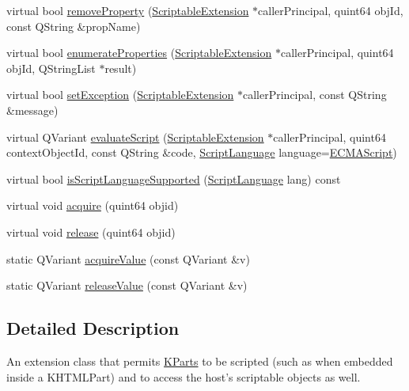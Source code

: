 \begin{DoxyCompactItemize}
\item 
virtual bool \hyperlink{classKParts_1_1ScriptableExtension_a72c9018ac01d931c4218ddbf963f93fb}{remove\-Property} (\hyperlink{classKParts_1_1ScriptableExtension}{\-Scriptable\-Extension} $\ast$caller\-Principal, quint64 obj\-Id, const \-Q\-String \&prop\-Name)
\item 
virtual bool \hyperlink{classKParts_1_1ScriptableExtension_a7630a47519df9f1ad5741e8d7cc436c2}{enumerate\-Properties} (\hyperlink{classKParts_1_1ScriptableExtension}{\-Scriptable\-Extension} $\ast$caller\-Principal, quint64 obj\-Id, \-Q\-String\-List $\ast$result)
\item 
virtual bool \hyperlink{classKParts_1_1ScriptableExtension_ac27156b3a945cb5ac69bbdfb18a501e8}{set\-Exception} (\hyperlink{classKParts_1_1ScriptableExtension}{\-Scriptable\-Extension} $\ast$caller\-Principal, const \-Q\-String \&message)
\item 
virtual \-Q\-Variant \hyperlink{classKParts_1_1ScriptableExtension_ae3ece3d86bd1410a0954e7dafc037d61}{evaluate\-Script} (\hyperlink{classKParts_1_1ScriptableExtension}{\-Scriptable\-Extension} $\ast$caller\-Principal, quint64 context\-Object\-Id, const \-Q\-String \&code, \hyperlink{classKParts_1_1ScriptableExtension_ae24e9c2e1e132201ddc092b8b069be23}{\-Script\-Language} language=\hyperlink{classKParts_1_1ScriptableExtension_ae24e9c2e1e132201ddc092b8b069be23a53f57a3152be4d9428e8ee66c0614882}{\-E\-C\-M\-A\-Script})
\item 
virtual bool \hyperlink{classKParts_1_1ScriptableExtension_adc8ddc26449ab07abdf05dab5fb06af1}{is\-Script\-Language\-Supported} (\hyperlink{classKParts_1_1ScriptableExtension_ae24e9c2e1e132201ddc092b8b069be23}{\-Script\-Language} lang) const 
\item 
virtual void \hyperlink{classKParts_1_1ScriptableExtension_aa9d21d12e60a00fa4adb0a3db0f52cad}{acquire} (quint64 objid)
\item 
virtual void \hyperlink{classKParts_1_1ScriptableExtension_a1a06fcb64081a052d29baae2376c371b}{release} (quint64 objid)
\item 
static \-Q\-Variant \hyperlink{classKParts_1_1ScriptableExtension_a048b779677ccf0e99e90b101281d31bc}{acquire\-Value} (const \-Q\-Variant \&v)
\item 
static \-Q\-Variant \hyperlink{classKParts_1_1ScriptableExtension_a45af0ab34d52c57452910b6161922c3c}{release\-Value} (const \-Q\-Variant \&v)
\end{DoxyCompactItemize}


\subsection{\-Detailed \-Description}
\-An extension class that permits \hyperlink{namespaceKParts}{\-K\-Parts} to be scripted (such as when embedded inside a \-K\-H\-T\-M\-L\-Part) and to access the host's scriptable objects as well.

